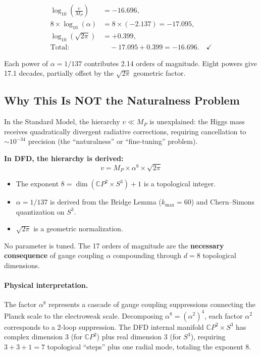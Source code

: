 \documentclass[11pt]{article}
\theoremstyle{definition}
\begin{document}
\begin{align}
\log_{10}\!\left(\frac{v}{M_P}\right) &= -16.696, \\
8 \times \log_{10}(\alpha) &= 8 \times (-2.137) = -17.095, \\
\log_{10}(\sqrt{2\pi}) &= +0.399, \\
\text{Total:} &\quad -17.095 + 0.399 = -16.696. \quad\checkmark
\end{align}

Each power of $\alpha = 1/137$ contributes 2.14 orders of magnitude.
Eight powers give 17.1 decades, partially offset by the
$\sqrt{2\pi}$ geometric factor.

\subsection{Why This Is NOT the Naturalness Problem}

\begin{tcolorbox}[colback=red!5!white, colframe=red!50!black,
title=DFD Resolution of the Hierarchy Problem]
In the Standard Model, the hierarchy $v \ll M_P$ is unexplained:
the Higgs mass receives quadratically divergent radiative corrections,
requiring cancellation to $\sim 10^{-34}$ precision (the
``naturalness'' or ``fine-tuning'' problem).

\textbf{In DFD, the hierarchy is derived:}
\begin{equation}
v = M_P \times \alpha^8 \times \sqrt{2\pi}
\end{equation}
\begin{itemize}
\item The exponent $8 = \dim(\mathbb{C}P^2 \times S^3) + 1$ is
      a topological integer.
\item $\alpha = 1/137$ is derived from the Bridge Lemma
      ($k_{\max} = 60$) and Chern--Simons quantization on $S^3$.
\item $\sqrt{2\pi}$ is a geometric normalization.
\end{itemize}

No parameter is tuned. The 17 orders of magnitude are the
\textbf{necessary consequence} of gauge coupling $\alpha$
compounding through $d = 8$ topological dimensions.
\end{tcolorbox}

\paragraph{Physical interpretation.}
The factor $\alpha^8$ represents a cascade of gauge coupling
suppressions connecting the Planck scale to the electroweak scale.
Decomposing $\alpha^8 = (\alpha^2)^4$, each factor $\alpha^2$
corresponds to a 2-loop suppression. The DFD internal manifold
$\mathbb{C}P^2 \times S^3$ has complex dimension 3 (for $\mathbb{C}P^2$)
plus real dimension 3 (for $S^3$), requiring $3 + 3 + 1 = 7$
topological ``steps'' plus one radial mode, totaling the exponent 8.
\end{document}
